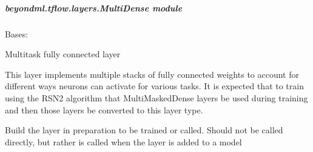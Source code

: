 \documentclass[letterpaper,10pt,english]{sphinxmanual}
\begin{document}
\subparagraph{beyondml.tflow.layers.MultiDense module}
\label{\detokenize{beyondml.tflow.layers:module-beyondml.tflow.layers.MultiDense}}\label{\detokenize{beyondml.tflow.layers:beyondml-tflow-layers-multidense-module}}

\begin{fulllineitems}
\label{\detokenize{beyondml.tflow.layers:beyondml.tflow.layers.MultiDense.MultiDense}}
\pysigstartsignatures
{}
\pysigstopsignatures
\sphinxAtStartPar
Bases: 

\sphinxAtStartPar
Multitask fully connected layer

\sphinxAtStartPar
This layer implements multiple stacks of fully connected weights to account for different
ways neurons can activate for various tasks. It is expected that to train using the RSN2 algorithm
that MultiMaskedDense layers be used during training and then those layers be converted to this layer type.

\begin{fulllineitems}
\label{\detokenize{beyondml.tflow.layers:beyondml.tflow.layers.MultiDense.MultiDense.build}}
\pysigstartsignatures
{}
\pysigstopsignatures
\sphinxAtStartPar
Build the layer in preparation to be trained or called. Should not be called directly,
but rather is called when the layer is added to a model

\end{fulllineitems}



\end{fulllineitems}
\end{document}
